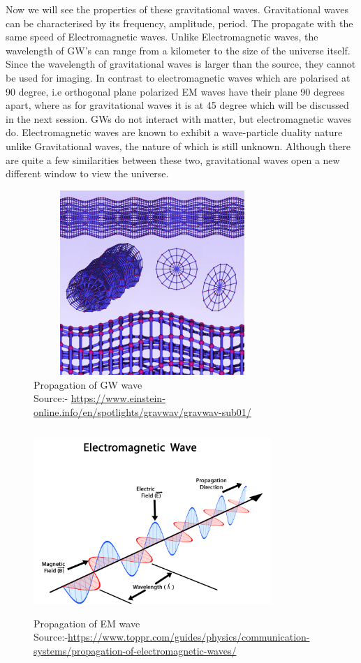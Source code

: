 Now we will see the properties of these gravitational waves. Gravitational waves can be characterised by its frequency, amplitude, period. The propagate with the same speed of Electromagnetic waves. Unlike Electromagnetic waves, the wavelength of GW’s can range from a kilometer to the size of the universe itself. Since the wavelength of gravitational waves is larger than the source, they cannot be used for imaging. In contrast to electromagnetic waves which are polarised at 90 degree, i.e orthogonal plane polarized EM waves have their plane 90 degrees apart, where as for gravitational waves it is at 45 degree which will be discussed in the next session. GWs do not interact with matter, but electromagnetic waves do. Electromagnetic waves are known to exhibit a wave-particle duality nature unlike Gravitational waves, the nature of which is still unknown. Although there are quite a few similarities between these two, gravitational waves open a new different window to view the universe. \cite{Thorne:1995xs}

\begin{figure}[h]
    \centering
    \includegraphics[height= 7cm, width=9cm]{images.tex/GW_propagation.jpg}
    \caption{Propagation of GW wave\\ Source:- \url{https://www.einstein-online.info/en/spotlights/gravwav/gravwav-sub01/}}
\end{figure}

\begin{figure}[h]
    \centering
    \includegraphics[height= 7cm, width=9cm]{images.tex/EM_propagation.png}
    \caption{Propagation of EM wave\\
    Source:-\;\url{https://www.toppr.com/guides/physics/communication-systems/propagation-of-electromagnetic-waves/}}
\end{figure}

\pagebreak
